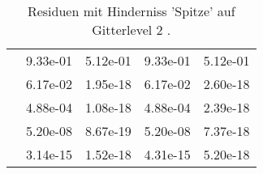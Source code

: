 \begin{table}
\begin{tabular}{c|cc|cc|}
\multicolumn{1}{|c|}{} & \multicolumn{1}{|c|}{  9.33e-01} & \multicolumn{1}{|c|}{  5.12e-01} & \multicolumn{1}{|c|}{  9.33e-01} & \multicolumn{1}{|c|}{  5.12e-01} \\ 
\multicolumn{1}{|c|}{} & \multicolumn{1}{|c|}{  6.17e-02} & \multicolumn{1}{|c|}{  1.95e-18} & \multicolumn{1}{|c|}{  6.17e-02} & \multicolumn{1}{|c|}{  2.60e-18} \\ 
\multicolumn{1}{|c|}{} & \multicolumn{1}{|c|}{  4.88e-04} & \multicolumn{1}{|c|}{  1.08e-18} & \multicolumn{1}{|c|}{  4.88e-04} & \multicolumn{1}{|c|}{  2.39e-18} \\ 
\multicolumn{1}{|c|}{} & \multicolumn{1}{|c|}{  5.20e-08} & \multicolumn{1}{|c|}{  8.67e-19} & \multicolumn{1}{|c|}{  5.20e-08} & \multicolumn{1}{|c|}{  7.37e-18} \\ 
\multicolumn{1}{|c|}{} & \multicolumn{1}{|c|}{  3.14e-15} & \multicolumn{1}{|c|}{  1.52e-18} & \multicolumn{1}{|c|}{  4.31e-15} & \multicolumn{1}{|c|}{  5.20e-18} \\ 
\hline 
\end{tabular}\caption{Residuen mit Hinderniss 'Spitze' auf Gitterlevel 2 .}\label{tab:Residuum_Spitze_level2}
\end{table} 

